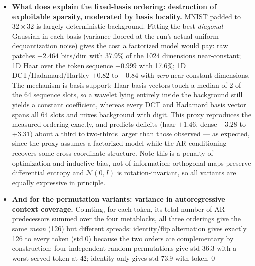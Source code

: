 \documentclass[11pt]{article}
\begin{document}
\begin{itemize}
        fact \emph{more} uniform across positions than raw patch scales.
        Scale spread remains a plausible account of the transient
        optimization blow-ups (which occur in every variant, including a
        $4.3\times10^{25}$ single-epoch spike in baseline\_flip at epoch~71
        that \texttt{grad\_clip} absorbed without lasting harm), but it does
        not explain which basis ends up ahead.
  \item \textbf{What does explain the fixed-basis ordering: destruction of
        exploitable sparsity, moderated by basis locality.} MNIST padded to
        $32\times32$ is largely deterministic background. Fitting the best
        \emph{diagonal} Gaussian in each basis (variance floored at the
        run's actual uniform-dequantization noise) gives the cost a
        factorized model would pay: raw patches $-2.464$ bits/dim with
        37.9\% of the 1024 dimensions near-constant; 1D Haar over the token
        sequence $-0.999$ with 17.6\%; 1D DCT/Hadamard/Hartley $+0.82$ to
        $+0.84$ with \emph{zero} near-constant dimensions. The mechanism is
        basis support: Haar basis vectors touch a median of 2 of the 64
        sequence slots, so a wavelet lying entirely inside the background
        still yields a constant coefficient, whereas every DCT and Hadamard
        basis vector spans all 64 slots and mixes background with digit.
        This proxy reproduces the measured ordering exactly, and predicts
        deficits (haar $+1.46$, dense $+3.28$ to $+3.31$) about a third to
        two-thirds larger than those observed --- as expected, since the
        proxy assumes a factorized model while the AR conditioning recovers
        some cross-coordinate structure. Note this is a penalty of
        optimization and inductive bias, not of information: orthogonal maps
        preserve differential entropy and $\mathcal{N}(0,I)$ is
        rotation-invariant, so all variants are equally expressive in
        principle.
  \item \textbf{And for the permutation variants: variance in
        autoregressive context coverage.} Counting, for each token, its
        total number of AR predecessors summed over the four metablocks, all
        three orderings give the same \emph{mean} (126) but different
        spreads: identity/flip alternation gives exactly 126 to every token
        (std 0) because the two orders are complementary by construction;
        four independent random permutations give std 36.3 with a
        worst-served token at 42; identity-only gives std 73.9 with token~0

\end{itemize}
\end{document}
